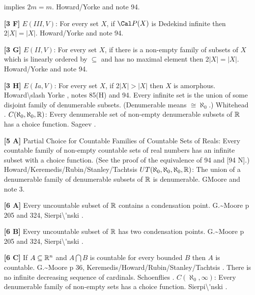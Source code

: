 implies $2m= m$.  \ac{Howard/Yorke} \cite{1989} and note 94.
\smallskip
\item{}{\bf [3 F]} $E(III,V)$: For every set $X$, if $\Cal P(X)$ is
Dedekind infinite then $2|X| = |X|$.  \ac{Howard/Yorke} \cite{1989} and
note 94.
\smallskip
\item{}{\bf [3 G]} $E(II,V)$:  For every set $X$, if there is a non-empty
family of subsets of $X$ which is linearly ordered by $\subseteq$ and
has no maximal element then $2|X| = |X|$. \ac{Howard/Yorke} \cite{1989} and
note 94.
\smallskip
\item{}{\bf [3 H]} $E(Ia,V)$: For every set $X$, if $2|X| > |X|$ then $X$
is amorphous.  \ac{Howard\slash Yorke} \cite{1989}, notes 85(H) and 94.
\medskip
{} Every infinite set is the union of some disjoint
family of denumerable subsets. (Denumerable means $\cong \aleph_0$.)
\ac{Whitehead} \cite{1902}.
\medskip
{} $C(\aleph_0,\aleph_0,\Bbb R)$: Every denumerable
set of non-empty denumerable subsets of ${\Bbb R}$ has a choice function.
\ac{Sageev} \cite{1975}.
\smallskip
\item{}{\bf [5 A]} Partial Choice for Countable Families of
Countable Sets of Reals: Every countable family of non-empty
countable sets of real numbers has an infinite subset with a
choice function. (See the proof of the equivalence of 94
and [94 N].) \ac{Howard/Keremedis/Rubin/Stanley/Tachtsis} \cite{1999}
\medskip
{} $UT(\aleph_0,\aleph_0,\aleph_0,\Bbb R)$: The
union of a denumerable  family  of denumerable subsets of ${\Bbb R}$ is
denumerable. G\. \ac{Moore} \cite{1982} and note 3.
\smallskip
\item{}{\bf [6 A]}  Every uncountable subset of ${\Bbb R}$ contains a
condensation point. \ac{G.~Moore} \cite{1982} p 205 and 324,
\ac{Sierpi\'nski} \cite{1918}.
\smallskip
\item{}{\bf [6 B]}  Every uncountable subset of ${\Bbb R}$ has two
condensation points.  \ac{G.~Moore} \cite{1982} p 205 and 324,
\ac{Sierpi\'nski} \cite{1918}.
\smallskip
\item{}{\bf [6 C]} If $A\subseteq{\Bbb R}^n$ and $A\bigcap B$ is
countable for every bounded $B$ then $A$ is countable. \ac{G.~Moore}
\cite{1982} p 36, \ac{Keremedis/Howard/Rubin/Stanley/Tachtsis} \cite{1999}.
\medskip
{} There is no infinite decreasing sequence of cardinals.
\ac{Schoenflies} \cite{1908}.
\medskip
{} $C(\aleph_{0},\infty)$:  Every denumerable family of
non-empty sets has a choice function.  \ac{Sierpi\'nski} \cite{1918}.
